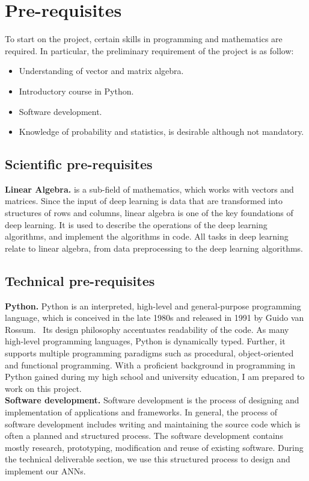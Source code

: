 
\section{Pre-requisites} 

To start on the project, certain skills in programming
and mathematics are required. In particular, the preliminary requirement of
the project is as follow:
\begin{itemize}
        \item Understanding of vector and matrix algebra.
        \item Introductory course in Python.
        \item Software development.
        \item Knowledge of probability and statistics, is desirable although not
          mandatory.
\end{itemize}

\subsection{Scientific pre-requisites}

\textbf{Linear Algebra.} is a sub-field of mathematics, which works with vectors
and matrices. Since the input of deep learning is data that are transformed into
structures of rows and columns, linear algebra is one of the key foundations of
deep learning. It is used to describe the operations of the deep learning
algorithms, and implement the algorithms in code. All tasks in deep learning
relate to linear algebra, from data preprocessing to the deep learning
algorithms.~\cite{Goodfellow-et-al-2016}

\subsection{Technical pre-requisites}

\textbf{Python.} Python is an interpreted, high-level and general-purpose
programming language, which is conceived in the late 1980s and released in 1991
by Guido van Rossum.~\cite{PyRo} Its design philosophy accentuates readability
of the code.  As many high-level programming languages, Python is dynamically
typed. Further, it supports multiple programming paradigms such as procedural,
object-oriented and functional programming. With a proficient background in
programming in Python gained during my high school and university education, I
am prepared to work on this project.\\

\textbf{Software development.} Software development is the process of designing
and implementation of applications and frameworks. In general, the process of
software development includes writing and maintaining the source code which is
often a planned and structured process. The software development contains mostly
research, prototyping, modification and reuse of existing software. During the
technical deliverable section, we use this structured process to design and
implement our ANNs. 
